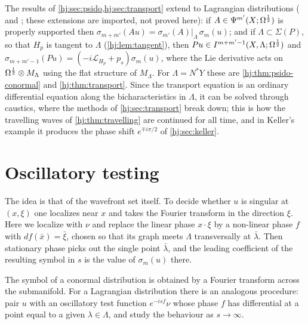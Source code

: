 \begin{remark}\label{hj:rem:lagrangian-ops}
  The results of \cref{hj:sec:psido,hj:sec:transport} extend to Lagrangian
  distributions (\cite[Chapter~25]{Hormander-IV} and
  \cite{Hormander-FIO}; these extensions are imported, not proved here): if
  $A\in\Psi^{m'}(X;\Omega^{\frac12})$ is properly supported then
  $\sigma_{m+m'}(Au)=\sigma_{m'}(A)|_\Lambda\,\sigma_m(u)$; and if
  $\Lambda\subset\Sigma(P)$, so that $H_p$ is tangent to $\Lambda$
  (\cref{hj:lem:tangent}), then $Pu\in I^{m+m'-1}(X,\Lambda;\Omega^{\frac12})$ and
  $\sigma_{m+m'-1}(Pu)=(-i\mathcal L_{H_p}+p_s)\sigma_m(u)$, where the Lie
  derivative acts on $\Omega^{\frac12}\otimes M_\Lambda$ using the flat structure of
  $M_\Lambda$.  For $\Lambda=N^*Y$ these are \cref{hj:thm:psido-conormal} and
  \cref{hj:thm:transport}.  Since the transport equation is an ordinary
  differential equation along the bicharacteristics in $\Lambda$, it can be
  solved through caustics, where the methods of \cref{hj:sec:transport} break
  down; this is how the travelling waves of \cref{hj:thm:travelling} are
  continued for all time, and in Keller's example it produces the phase shift
  $e^{\mp i\pi/2}$ of \cref{hj:sec:keller}.
\end{remark}

\section{Oscillatory testing}\label{hj:sec:testing}

\begin{discussion}
The idea is that of the wavefront set itself. To decide whether $u$ is singular at
$(x,\xi)$ one localizes near $x$ and takes the Fourier transform in the direction
$\xi$. Here we localize with $\nu$ and replace the linear phase $x\cdot\xi$ by a
non-linear phase $f$ with $df(\bar x)=\bar\xi$, chosen so that its graph meets
$\Lambda$ transversally at $\bar\lambda$. Then stationary phase picks out the single
point $\bar\lambda$, and the leading coefficient of the resulting symbol in $s$ is the
value of $\sigma_m(u)$ there.
\end{discussion}

The symbol of a conormal distribution is obtained by a Fourier transform across
the submanifold.  For a Lagrangian distribution there is an analogous
procedure: pair $u$ with an oscillatory test function $e^{-isf}\nu$ whose phase
$f$ has differential at a point equal to a given $\lambda\in\Lambda$, and study
the behaviour as $s\to\infty$.

